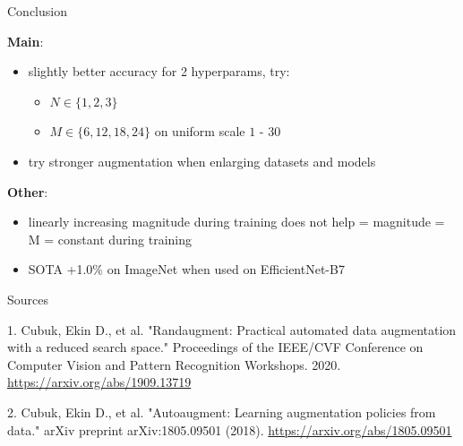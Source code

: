 \documentclass{beamer}
\begin{document}
\begin{frame}{Conclusion}

\textbf{Main}:
\begin{itemize}
\item slightly better accuracy for 2 hyperparams, try: 
\begin{itemize}
\item $N \in \{1, 2, 3\}$
\item $M \in \{6, 12, 18, 24\}$ on uniform scale $1$ - $30$

\end{itemize}

\item try stronger augmentation when enlarging datasets and models
\end{itemize}

\vfill

\textbf{Other}:
\begin{itemize}
\item linearly increasing magnitude during training does not help = magnitude = M = constant during training
\item SOTA +1.0\% on ImageNet when used on EfficientNet-B7 
\end{itemize}

\end{frame}

\begin{frame}{Sources}
\begin{thebibliography}{0}

   1. Cubuk, Ekin D., et al. "Randaugment: Practical automated data augmentation with a reduced search space." Proceedings of the IEEE/CVF Conference on Computer Vision and Pattern Recognition Workshops. 2020. \url{https://arxiv.org/abs/1909.13719} 
  
    2. Cubuk, Ekin D., et al. "Autoaugment: Learning augmentation policies from data." arXiv preprint arXiv:1805.09501 (2018). \url{https://arxiv.org/abs/1805.09501} 
   
\end{thebibliography}
\end{frame} 
\end{document}
